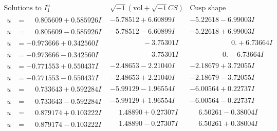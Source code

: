 \documentclass[1p]{elsarticle_modified}
\theoremstyle{definition}
\newcommand{\I}{\sqrt{-1}}
\begin{document}
$$\begin{array}{c|c|c}  
\text{Solutions to }I^u_{1}& \I (\text{vol} + \sqrt{-1}CS) & \text{Cusp shape}\\
 \hline 
\begin{aligned}
u &= \phantom{-}0.805609 + 0.585926 I\end{aligned}
 & -5.78512 + 6.60899 I & -5.22618 - 6.99003 I \\ \hline\begin{aligned}
u &= \phantom{-}0.805609 - 0.585926 I\end{aligned}
 & -5.78512 - 6.60899 I & -5.22618 + 6.99003 I \\ \hline\begin{aligned}
u &= -0.973666 + 0.342560 I\end{aligned}
 & \phantom{-0.000000 } -3.75301 I & \phantom{-0.000000 -}0. + 6.73664 I \\ \hline\begin{aligned}
u &= -0.973666 - 0.342560 I\end{aligned}
 & \phantom{-0.000000 -}3.75301 I & \phantom{-0.000000 } 0. - 6.73664 I \\ \hline\begin{aligned}
u &= -0.771553 + 0.550437 I\end{aligned}
 & -2.48653 - 2.21040 I & -2.18679 + 3.72055 I \\ \hline\begin{aligned}
u &= -0.771553 - 0.550437 I\end{aligned}
 & -2.48653 + 2.21040 I & -2.18679 - 3.72055 I \\ \hline\begin{aligned}
u &= \phantom{-}0.733643 + 0.592284 I\end{aligned}
 & -5.99129 - 1.96554 I & -6.00564 + 0.22737 I \\ \hline\begin{aligned}
u &= \phantom{-}0.733643 - 0.592284 I\end{aligned}
 & -5.99129 + 1.96554 I & -6.00564 - 0.22737 I \\ \hline\begin{aligned}
u &= \phantom{-}0.879174 + 0.103222 I\end{aligned}
 & \phantom{-}1.48890 + 0.27307 I & \phantom{-}6.50261 - 0.38004 I \\ \hline\begin{aligned}
u &= \phantom{-}0.879174 - 0.103222 I\end{aligned}
 & \phantom{-}1.48890 - 0.27307 I & \phantom{-}6.50261 + 0.38004 I \\ \hline\begin{aligned}

\end{aligned}
\end{array}$$
\end{document}
